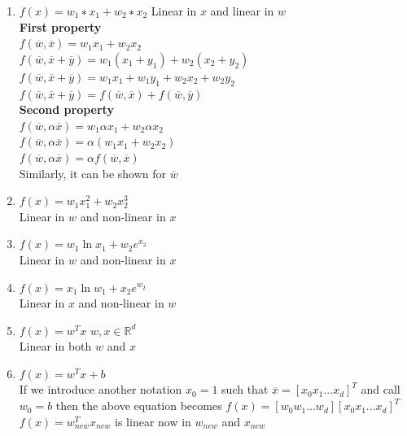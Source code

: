 \documentclass[12pt]{article}
\begin{document}
\begin{enumerate}
    \item  $f(x) = w_1 ∗ x_1 + w_2 ∗ x_2$
Linear in $x$ and linear in $w$ \\
\textbf{First property}\\
$f(\overline{w},\overline{x}) = w_1 x_1 + w_2 x_2$ \\
$f(\overline{w},\overline{x} + \overline{y}) = w_1 (x_1 + y_1) + w_2 (x_2 + y_2)$ \\
$f(\overline{w},\overline{x} + \overline{y}) = w_1 x_1 + w_1 y_1 + w_2 x_2 + w_2 y_2$  \\
$f(\overline{w},\overline{x} + \overline{y}) = f(\overline{w},\overline{x}) + f(\overline{w},\overline{y})$\\
\textbf{Second property}\\
$f(\overline{w},\alpha \overline{x}) = w_1 \alpha x_1 + w_2 \alpha x_2$ \\
$f(\overline{w},\alpha \overline{x}) = \alpha (w_1 x_1 + w_2 x_2)$ \\
$f(\overline{w},\alpha \overline{x}) = \alpha f(\overline{w},\overline{x}) $ \\
Similarly, it can be shown for $\overline{w}$ \\

\item $f(x) = w_1 x_1^2 + w_2 x_2^3$ \\
Linear in $w$ and non-linear in $x$ \\

\item $f(x) = w_1 \ln{x_1} + w_2 e^{x_2}$ \\
Linear in $w$ and non-linear in $x$ \\

\item $f(x) = x_1 \ln{w_1} + x_2 e^{w_2}$ \\
Linear in $x$ and non-linear in $w$ \\

\item $f(x) = w^T x$ \hspace{0.1cm} $w,x \in \mathbb{R}^d$ \\
Linear in both $w$ and $x$ \\

\item $f(x) = w^T x + b$ \\
If we introduce another notation $x_0 = 1$ such that $\overline{x} = [x_0 x_1 ... x_d]^T$ and call $w_0 = b$ then the above equation becomes $f(x) = [w_0 w_1 ... w_d][x_0 x_1 ... x_d]^T$ \\
$f(x) = w_{new}^T x_{new}$ is linear now in $w_{new}$ and $x_{new}$

\end{enumerate}
\end{document}
